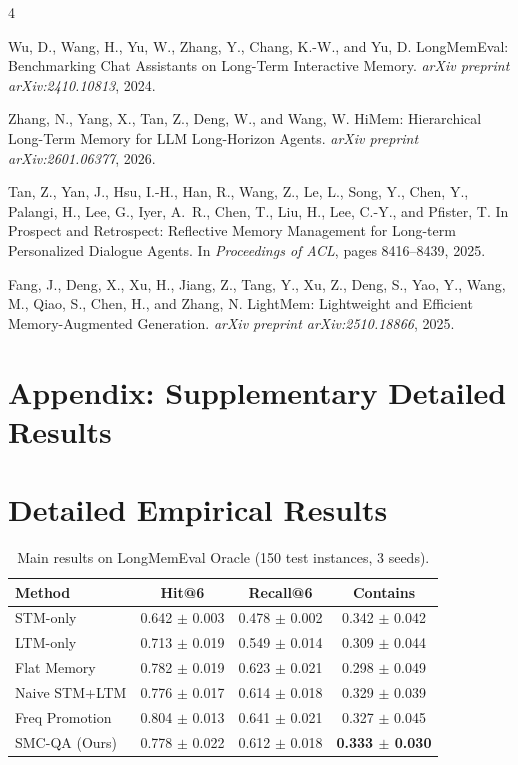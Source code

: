 \documentclass{article}
\begin{document}
\begin{thebibliography}{4}

Wu, D., Wang, H., Yu, W., Zhang, Y., Chang, K.-W., and Yu, D.
\newblock LongMemEval: Benchmarking Chat Assistants on Long-Term Interactive Memory.
\newblock \emph{arXiv preprint arXiv:2410.10813}, 2024.

Zhang, N., Yang, X., Tan, Z., Deng, W., and Wang, W.
\newblock HiMem: Hierarchical Long-Term Memory for LLM Long-Horizon Agents.
\newblock \emph{arXiv preprint arXiv:2601.06377}, 2026.

Tan, Z., Yan, J., Hsu, I.-H., Han, R., Wang, Z., Le, L., Song, Y., Chen, Y., Palangi, H., Lee, G., Iyer, A.~R., Chen, T., Liu, H., Lee, C.-Y., and Pfister, T.
\newblock In Prospect and Retrospect: Reflective Memory Management for Long-term Personalized Dialogue Agents.
\newblock In \emph{Proceedings of ACL}, pages 8416--8439, 2025.

Fang, J., Deng, X., Xu, H., Jiang, Z., Tang, Y., Xu, Z., Deng, S., Yao, Y., Wang, M., Qiao, S., Chen, H., and Zhang, N.
\newblock LightMem: Lightweight and Efficient Memory-Augmented Generation.
\newblock \emph{arXiv preprint arXiv:2510.18866}, 2025.

\end{thebibliography}

\clearpage
\appendix

\section*{Appendix: Supplementary Detailed Results}

\section{Detailed Empirical Results}
\label{app:detailed-results}

\begin{table}[H]
\centering
\caption{Main results on LongMemEval Oracle (150 test instances, 3 seeds).}
\label{tab:main}
\begin{tabular}{lccc}
\toprule
\textbf{Method} & \textbf{Hit@6} & \textbf{Recall@6} & \textbf{Contains} \\
\midrule
STM-only & 0.642 $\pm$ 0.003 & 0.478 $\pm$ 0.002 & 0.342 $\pm$ 0.042 \\
LTM-only & 0.713 $\pm$ 0.019 & 0.549 $\pm$ 0.014 & 0.309 $\pm$ 0.044 \\
Flat Memory & 0.782 $\pm$ 0.019 & 0.623 $\pm$ 0.021 & 0.298 $\pm$ 0.049 \\
Naive STM+LTM & 0.776 $\pm$ 0.017 & 0.614 $\pm$ 0.018 & 0.329 $\pm$ 0.039 \\
Freq Promotion & 0.804 $\pm$ 0.013 & 0.641 $\pm$ 0.021 & 0.327 $\pm$ 0.045 \\
SMC-QA (Ours) & 0.778 $\pm$ 0.022 & 0.612 $\pm$ 0.018 & \textbf{0.333 $\pm$ 0.030} \\
\bottomrule
\end{tabular}
\end{table}
\end{document}
